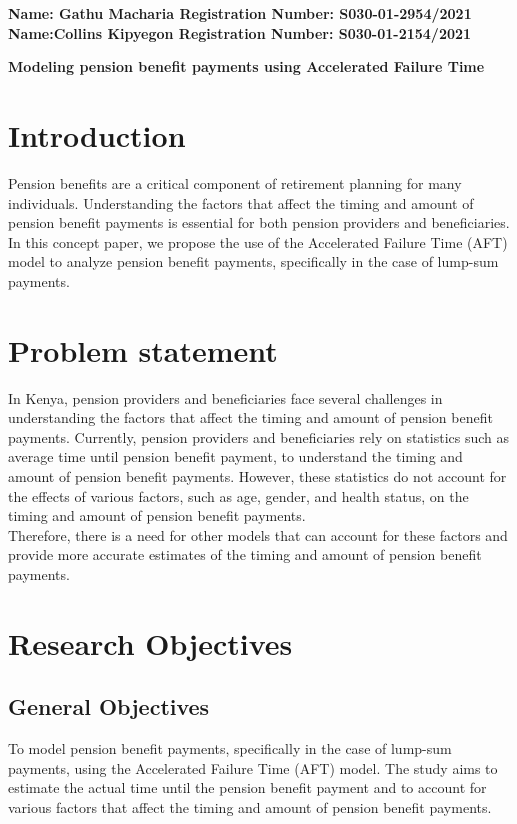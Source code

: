 \documentclass[twoside,a4paper,12pt]{article}
\begin{document}
	
	\begin{flushleft} 
			\large{\bf{Name: Gathu Macharia     Registration Number: S030-01-2954/2021\\
					   Name:Collins Kipyegon        Registration Number: S030-01-2154/2021\\}} \vspace*{0.75in}
	\end{flushleft}
	
	\begin{center} \Large{ \bf{Modeling pension benefit payments using Accelerated Failure Time}} \end{center}	


\section*{Introduction} Pension benefits are a critical component of retirement planning for many individuals. Understanding the factors that affect the timing and amount of pension benefit payments is essential for both pension providers and beneficiaries. In this concept paper, we propose the use of the Accelerated Failure Time (AFT) model to analyze pension benefit payments, specifically in the case of lump-sum payments.


\section*{Problem statement}In Kenya, pension providers and beneficiaries face several challenges in understanding the factors that affect the timing and amount of pension benefit payments. Currently, pension providers and beneficiaries rely on statistics such as average time until pension benefit payment, to understand the timing and amount of pension benefit payments. However, these statistics do not account for the effects of various factors, such as age, gender, and health status, on the timing and amount of pension benefit payments.\\

\noindent Therefore, there is a need for other models that can account for these factors and provide more accurate estimates of the timing and amount of pension benefit payments.


\section*{Research Objectives} 
\subsection*{General Objectives}To model pension benefit payments, specifically in the case of lump-sum payments, using the Accelerated Failure Time (AFT) model. The study aims to estimate the actual time until the pension benefit payment and to account for various factors that affect the timing and amount of pension benefit payments.
\end{document}

